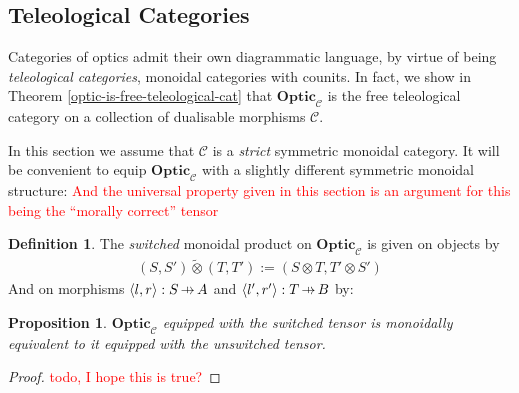 \documentclass[11pt,a4paper]{article}
\theoremstyle{plain}
\newtheorem{proposition}[theorem]{Proposition}
\theoremstyle{definition}
\newtheorem{definition}[theorem]{Definition}
\newcommand{\C}{\mathscr{C}}
\newcommand{\Optic}{\mathbf{Optic}}
\newcommand{\switched}{\mathbin{\tilde{\otimes}}}
\newcommand{\hto}{\ensuremath{\,\mathaccent\shortmid\rightarrow\,}}
\newcommand{\todo}[1]{\textcolor{red}{\small #1}}
\begin{document}
\subsection{Teleological Categories}
\label{teleological-categories}

Categories of optics admit their own diagrammatic language, by virtue of being \emph{teleological categories}, monoidal categories with counits. In fact, we show in Theorem \ref{optic-is-free-teleological-cat} that $\Optic_\C$ is the free teleological category on a collection of dualisable morphisms $\C$.

In this section we assume that $\C$ is a \emph{strict} symmetric monoidal category. It will be convenient to equip $\Optic_\C$ with a slightly different symmetric monoidal structure: \todo{And the universal property given in this section is an argument for this being the ``morally correct'' tensor}

\begin{definition}
The \emph{switched} monoidal product on $\Optic_\C$ is given on objects by 
\begin{align*}
(S, S') \switched (T, T') := (S \otimes T, T' \otimes S')
\end{align*}
And on morphisms $\langle l, r \rangle : S \hto A$ and $\langle l', r' \rangle : T \hto B$ by:
\begin{center}

\end{center}
\end{definition}

\begin{proposition}
$\Optic_\C$ equipped with the switched tensor is monoidally equivalent to it equipped with the unswitched tensor.
\end{proposition}
\begin{proof}
\todo{todo, I hope this is true?}
\end{proof}
\end{document}
